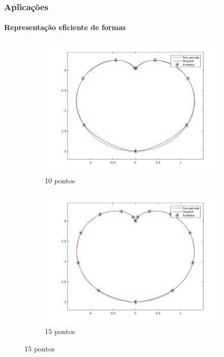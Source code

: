 \begin{frame}
\frametitle{{\bf \color{blue} Aplicações}}
\framesubtitle{\color{blue} Representação eficiente de formas}

\begin{figure}
	\centering
	\begin{subfigure}[b]{0.31\textwidth}
		\centering
		\includegraphics[trim={5cm 2cm 3cm 2cm},clip,width=\textwidth]{imagens/rep_1_10.jpg}
		\caption{10 pontos}
		\label{fig:ex14}
	\end{subfigure}
	\hfill
	\begin{subfigure}[b]{0.31\textwidth}
		\centering
		\includegraphics[trim={5cm 2cm 3cm 2cm},clip,width=\textwidth]{imagens/rep_1_15.jpg}
		\caption{15 pontos}

\end{subfigure}
\end{figure}
\end{frame}
